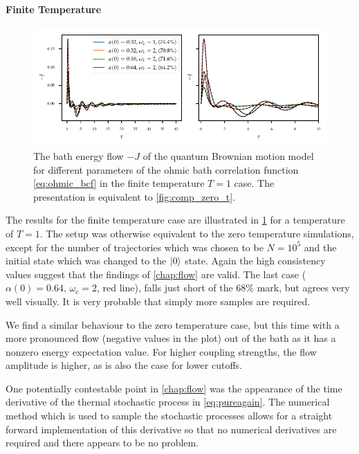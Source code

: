 \paragraph{Finite Temperature}
\begin{figure}[t]
  \centering
  \includegraphics{figs/analytic_comp/flow_comp_nonzero.pdf}
  \caption{\label{fig:comp_finite_t} The bath energy flow \(-J\) of
    the quantum Brownian motion model for different parameters of the
    ohmic bath correlation function \cref{eq:ohmic_bcf} in the finite
    temperature \(T=1\) case. The presentation is equivalent to
    \cref{fig:comp_zero_t}.}
\end{figure}
The results for the finite temperature case are illustrated in
\cref{fig:comp_finite_t} for a temperature of \(T=1\). The setup was
otherwise equivalent to the zero temperature simulations, except for
the number of trajectories which was chosen to be \(N=10^5\) and the
initial state which was changed to the \(\ket{0}\) state.  Again the
high consistency values suggest that the findings of \cref{chap:flow}
are valid. The last case (\(α(0)=0.64,\, ω_c=2\), red line), falls
just short of the \(68\%\) mark, but agrees very well visually. It is
very probable that simply more samples are required.

We find a similar behaviour to the zero temperature case, but this
time with a more pronounced flow (negative values in the plot) out of
the bath as it has a nonzero energy expectation value. For higher
coupling strengths, the flow amplitude is higher, as is also the case
for lower cutoffs.

One potentially contestable point in \cref{chap:flow} was the
appearance of the time derivative of the thermal stochastic process in
\cref{eq:pureagain}. The numerical method which is used to sample the
stochastic processes allows for a straight forward implementation of
this derivative so that no numerical derivatives are required and
there appears to be no problem.

